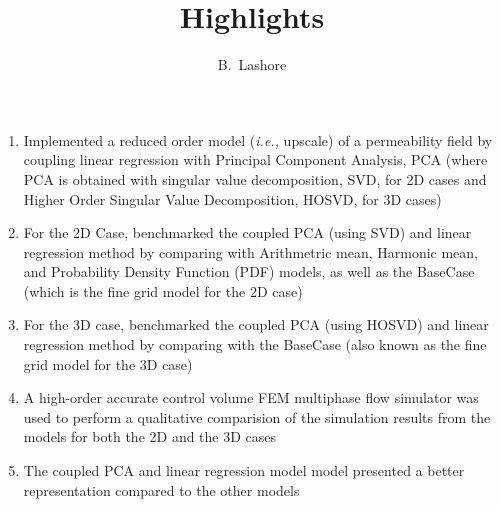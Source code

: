 \documentclass[a4paper,11pt]{article}
\author{B.~Lashore}
\title{Highlights}
\newcommand{\ie}{{\it i.e., }}
\begin{document}
\maketitle

\begin{enumerate}
  \item Implemented a reduced order model (\ie{upscale}) of a permeability field by coupling linear regression with Principal Component Analysis, PCA (where PCA is obtained with singular value decomposition, SVD, for 2D cases and Higher Order Singular Value Decomposition, HOSVD, for 3D cases)
  \item For the 2D Case, benchmarked the coupled PCA (using SVD) and linear regression method by comparing with Arithmetric mean, Harmonic mean, and Probability Density Function (PDF) models, as well as the BaseCase (which is the fine grid model for the 2D case)
  \item For the 3D case, benchmarked the coupled PCA (using HOSVD) and linear regression method by comparing with the BaseCase (also known as the fine grid model for the 3D case)
  \item A high-order accurate control volume FEM multiphase flow simulator was used to perform a qualitative comparision of the simulation results from the models for both the 2D and the 3D cases
  \item The coupled PCA and linear regression model model presented a better representation compared to the other models 
\end{enumerate}
\end{document}
